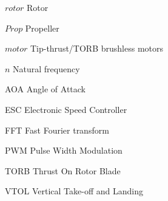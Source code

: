 \begin{Nomencl}[1cm]
    \item[$rotor$]          Rotor
    \item[$Prop$]           Propeller
    \item[$motor$]          Tip-thrust/TORB brushless motors
    \item[$n$]              Natural frequency  

\end{Nomencl}

\begin{Nomencl}[1cm]
    \item[AOA] Angle of Attack
    \item[ESC] Electronic Speed Controller
    \item[FFT] Fast Fourier transform
    \item[PWM] Pulse Width Modulation
    \item[TORB] Thrust On Rotor Blade
    \item[VTOL] Vertical Take-off and Landing
\end{Nomencl}
